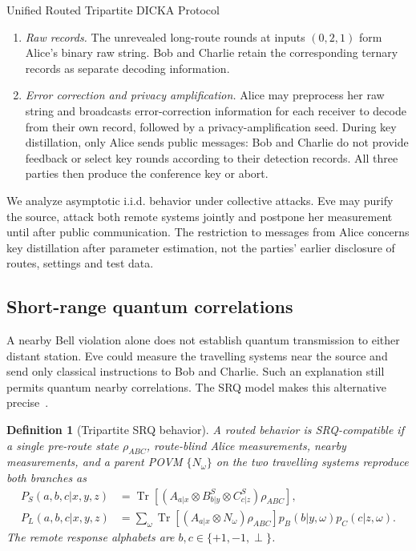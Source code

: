 \documentclass[aps,10pt,onecolumn,prx,superscriptaddress,longbibliography,nofootinbib]{revtex4-2}
\newcommand{\Tr}{\operatorname{Tr}}
\newcommand{\perpout}{\perp}
\newtheorem{definition}[theorem]{Definition}
\begin{document}
\begin{protocolbox}{Unified Routed Tripartite DICKA Protocol}
\begin{enumerate}
\begin{enumerate}
  \item \textit{Raw records.}
  The unrevealed long-route rounds at inputs $(0,2,1)$ form Alice's binary raw string. Bob and Charlie retain the corresponding ternary records as separate decoding information.

  \item \textit{Error correction and privacy amplification.}
  Alice may preprocess her raw string and broadcasts error-correction information for each receiver to decode from their own record, followed by a privacy-amplification seed. During key distillation, only Alice sends public messages: Bob and Charlie do not provide feedback or select key rounds according to their detection records. All three parties then produce the conference key or abort.
\end{enumerate}
\end{enumerate}
\end{protocolbox}

We analyze asymptotic i.i.d. behavior under collective attacks. Eve may purify the source, attack both remote systems jointly and postpone her measurement until after public communication. The restriction to messages from Alice concerns key distillation after parameter estimation, not the parties' earlier disclosure of routes, settings and test data.

\subsection{Short-range quantum correlations}

A nearby Bell violation alone does not establish quantum transmission to either distant station. Eve could measure the travelling systems near the source and send only classical instructions to Bob and Charlie. Such an explanation still permits quantum nearby correlations. The SRQ model makes this alternative precise~\cite{Lobo2024}.

\begin{definition}[Tripartite SRQ behavior]\label{def:srq}
A routed behavior is SRQ-compatible if a single pre-route state \(\rho_{ABC}\), route-blind Alice measurements, nearby measurements, and a parent POVM \(\{N_\omega\}\) on the two travelling systems reproduce both branches as
\begin{align}
 P_S(a,b,c|x,y,z)&=\Tr[(A_{a|x}\otimes B^S_{b|y}\otimes C^S_{c|z})\rho_{ABC}],\label{eq:srq-short}\\
 P_L(a,b,c|x,y,z)&=\sum_\omega\Tr[(A_{a|x}\otimes N_\omega)\rho_{ABC}]
 p_B(b|y,\omega)p_C(c|z,\omega).
 \label{eq:srq-long}
\end{align}
The remote response alphabets are \(b,c\in\{+1,-1,\perpout\}\).
\end{definition}
\end{document}
